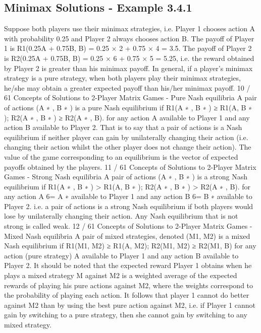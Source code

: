 \documentclass[]{report}
\begin{document}
\subsection{Minimax Solutions - Example 3.4.1}
Suppose both players use their minimax strategies, i.e. Player 1
chooses action A with probability 0.25 and Player 2 always chooses
action B.
The payoff of Player 1 is
R1(0.25A + 0.75B, B) = 0.25 × 2 + 0.75 × 4 = 3.5.
The payoff of Player 2 is
R2(0.25A + 0.75B, B) = 0.25 × 6 + 0.75 × 5 = 5.25, i.e. the
reward obtained by Player 2 is greater than his minimax payoff.
In general, if a player’s minimax strategy is a pure strategy, when
both players play their minimax strategies, he/she may obtain a
greater expected payoff than his/her minimax payoff.
10 / 61
Concepts of Solutions to 2-Player Matrix Games - Pure
Nash equilibria
A pair of actions (A
∗
, B
∗
) is a pure Nash equilibrium if
R1(A
∗
, B
∗
) ≥ R1(A, B
∗
); R2(A
∗
, B
∗
) ≥ R2(A
∗
, B).
for any action A available to Player 1 and any action B available
to Player 2.
That is to say that a pair of actions is a Nash equilibrium if neither
player can gain by unilaterally changing their action (i.e. changing
their action whilst the other player does not change their action).
The value of the game corresponding to an equilibrium is the
vector of expected payoffs obtained by the players.
11 / 61
Concepts of Solutions to 2-Player Matrix Games - Strong
Nash equilibria
A pair of actions (A
∗
, B
∗
) is a strong Nash equilibrium if
R1(A
∗
, B
∗
) > R1(A, B
∗
); R2(A
∗
, B
∗
) > R2(A
∗
, B).
for any action A 6= A
∗
available to Player 1 and any action B 6= B
∗
available to Player 2.
i.e. a pair of actions is a strong Nash equilibrium if both players
would lose by unilaterally changing their action.
Any Nash equilibrium that is not strong is called weak.
12 / 61
Concepts of Solutions to 2-Player Matrix Games - Mixed
Nash equilibria
A pair of mixed strategies, denoted (M1, M2) is a mixed Nash
equilibrium if
R1(M1, M2) ≥ R1(A, M2); R2(M1, M2) ≥ R2(M1, B)
for any action (pure strategy) A available to Player 1 and any
action B available to Player 2.
It should be noted that the expected reward Player 1 obtains when
he plays a mixed strategy M against M2 is a weighted average of
the expected rewards of playing his pure actions against M2, where
the weights correspond to the probability of playing each action.
It follows that player 1 cannot do better against M2 than by using
the best pure action against M2, i.e. if Player 1 cannot gain by
switching to a pure strategy, then she cannot gain by switching to
any mixed strategy.
\end{document}
